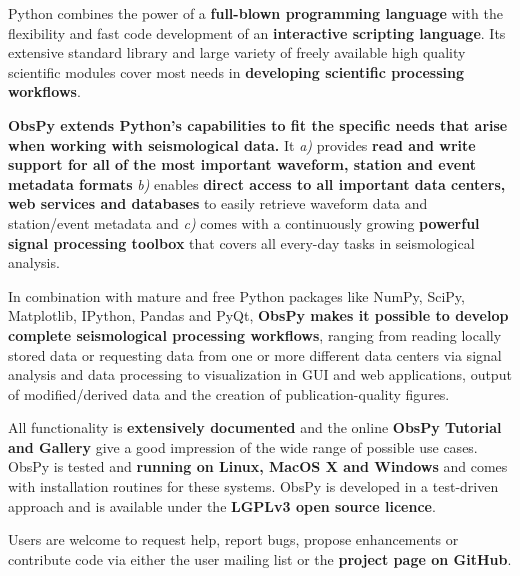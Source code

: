 \small
Python combines the power of a \textbf{full-blown programming language} with the
flexibility and fast code development of an \textbf{interactive scripting
language}. Its extensive standard library and large variety of freely available
high quality scientific modules cover most needs in \textbf{developing
scientific processing workflows}.

\textbf{ObsPy extends Python’s capabilities to fit the specific needs that
arise when working with seismological data.} It \textit{a)} provides
\textbf{read and write support for all of the most important waveform, station
and event metadata formats} \textit{b)} enables
\textbf{direct access to all important data centers, web services and
databases} to easily retrieve waveform data and station/event metadata and
\textit{c)} comes with a continuously growing \textbf{powerful signal
processing toolbox} that covers all every-day tasks in seismological analysis.

In combination with mature and free Python packages like NumPy, SciPy,
Matplotlib, IPython, Pandas and PyQt, \textbf{ObsPy makes it possible to
develop complete seismological processing workflows}, ranging
from reading locally stored data or requesting data from one or more different
data centers via signal analysis and data processing to visualization in GUI
and web applications, output of modified/derived data and the creation of
publication-quality figures.

All functionality is \textbf{extensively documented} and the online \textbf{ObsPy
Tutorial and Gallery} give a good impression of the wide range of possible use
cases. ObsPy is tested and \textbf{running on Linux, MacOS X and Windows} and
comes with installation routines for these systems. ObsPy is developed in a
test-driven approach and is available under the \textbf{LGPLv3 open source
licence}.

Users are welcome to request help, report bugs, propose enhancements or
contribute code via either the user mailing list or the \textbf{project page on
GitHub}.
